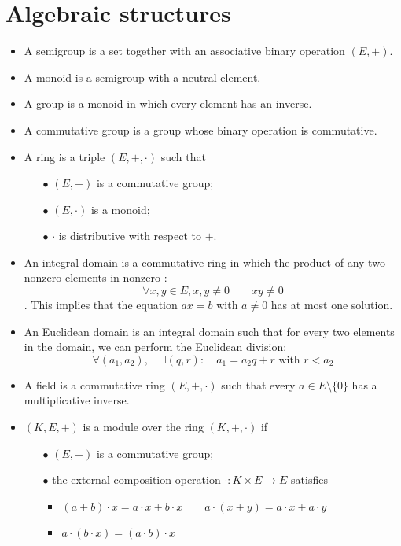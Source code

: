 \documentclass[12pt, openany]{report}
\theoremstyle{definition}
\begin{document}
\section{Algebraic structures}
\begin{itemize}
    \item A semigroup is a set together with an associative binary operation \((E,+)\).
    \item A monoid is a semigroup with a neutral element.
    \item A group is a monoid in which every element has an inverse.
    \item A commutative group is a group whose binary operation is commutative.
    \item A ring is a triple \((E,+,\cdot)\) such that
    \begin{itemize}
        \item [\(\bullet\)] \((E,+)\) is a commutative group;
        \item [\(\bullet\)] \((E,\cdot)\) is a monoid;
        \item [\(\bullet\)] $\cdot$ is distributive with respect to \(+\).
    \end{itemize}
    \item An integral domain is a commutative ring in which the product of any two nonzero elements in nonzero : \[\forall x,y\in E, x,y\neq 0\qquad xy\neq 0\]. This implies that the equation \(ax=b\) with \(a\neq 0\) has at most one solution. 
    \item An Euclidean domain is an integral domain such that for every two elements in the domain, we can perform the Euclidean division: \[\forall (a_1,a_2), \quad \exists (q,r) : \quad a_1=a_2q+r \text{ with }r<a_2\]
    \item A field is a commutative ring \((E,+,\cdot)\) such that every \(a\in E\setminus \{0\}\) has a multiplicative inverse.
    \item \((K,E,+)\) is a module over the ring \((K,+,\cdot)\) if 
    \begin{itemize}
        \item [\(\bullet\)] \((E,+)\) is a commutative group;
        \item [\(\bullet\)] the external composition operation \(\cdot:K\times E\rightarrow E\) satisfies 
        \begin{itemize}
            \item \((a+b)\cdot x = a\cdot x+b \cdot x \qquad a\cdot (x+y) = a\cdot x+a\cdot y\)
            \item \(a\cdot (b\cdot x) = (a\cdot b)\cdot x\)

\end{itemize}
\end{itemize}
\end{itemize}
\end{document}
